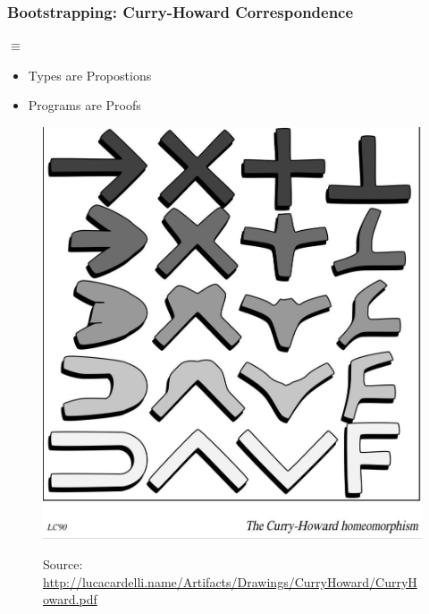 \begin{frame}[c]
  \frametitle{Bootstrapping: Curry-Howard Correspondence}
  \begin{center}
       $\equiv$ 
    \begin{itemize}
    \item Types are Propostions
    \item Programs are Proofs
    \end{itemize}

    \begin{figure}[h]
      \centering
      \includegraphics[scale=0.1]{cardelli-hc-corr.jpg}

      {{\tiny Source: \url{http://lucacardelli.name/Artifacts/Drawings/CurryHoward/CurryHoward.pdf}}}
    \end{figure}
\end{center}
\end{frame}

